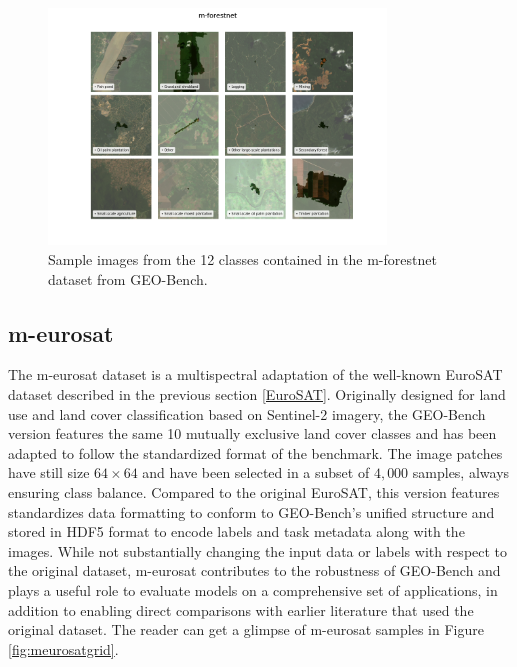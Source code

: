\documentclass[a4paper, oneside, english]{sapthesis} %
\begin{document}
\vspace{0.3cm}

\begin{figure}[h]
    \centering
    \includegraphics[width=0.8\textwidth]{img/m-forestnet_image_grid.png}
    \caption{\normalsize Sample images from the 12 classes contained in the m-forestnet dataset from GEO-Bench.}
    \label{fig:forestnetgrid}
\end{figure}


\subsection{m-eurosat}

The m-eurosat dataset is a multispectral adaptation of the well-known EuroSAT dataset \cite{helber2019eurosat} described in the previous section \ref{EuroSAT}. Originally designed for land use and land cover classification based on Sentinel-2 imagery, the GEO-Bench version features the same 10 mutually exclusive land cover classes and has been adapted to follow the standardized format of the benchmark. The image patches have still size $64 \times 64$ and have been selected in a subset of $4,000$ samples, always ensuring class balance. Compared to the original EuroSAT, this version features standardizes data formatting to conform to GEO-Bench's unified structure and stored in HDF5 format to encode labels and task metadata along with the images. While not substantially changing the input data or labels with respect to the original dataset, m-eurosat contributes to the robustness of GEO-Bench and plays a useful role to evaluate models on a comprehensive set of applications, in addition to enabling direct comparisons with earlier literature that used the original dataset. The reader can get a glimpse of m-eurosat samples in Figure \ref{fig:meurosatgrid}.
\end{document}
